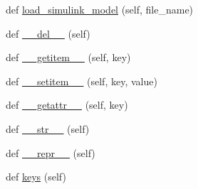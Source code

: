 \begin{DoxyCompactItemize}
\item 
def \hyperlink{classsylva_1_1misc_1_1exec_1_1_s_y_l_v_a_a9b8d4f144cb6e5feedd40761fdc3394f}{load\+\_\+simulink\+\_\+model} (self, file\+\_\+name)
\item 
def \hyperlink{classsylva_1_1misc_1_1exec_1_1_s_y_l_v_a_af65fde8b73d4a20bb2fba9d6d31d5e51}{\+\_\+\+\_\+del\+\_\+\+\_\+} (self)
\item 
def \hyperlink{classsylva_1_1misc_1_1exec_1_1_dict_object_ab360685e86a5d323b99adcde29546ebb}{\+\_\+\+\_\+getitem\+\_\+\+\_\+} (self, key)
\item 
def \hyperlink{classsylva_1_1misc_1_1exec_1_1_dict_object_a219a0c8ab7c1f0a05a76c5c79f86fe59}{\+\_\+\+\_\+setitem\+\_\+\+\_\+} (self, key, value)
\item 
def \hyperlink{classsylva_1_1misc_1_1exec_1_1_dict_object_a194306589e55ae82911d017462eb5f8e}{\+\_\+\+\_\+getattr\+\_\+\+\_\+} (self, key)
\item 
def \hyperlink{classsylva_1_1misc_1_1exec_1_1_dict_object_a7c974971714369cdba35b66479addd71}{\+\_\+\+\_\+str\+\_\+\+\_\+} (self)
\item 
def \hyperlink{classsylva_1_1misc_1_1exec_1_1_dict_object_a50fd48db155e090c3fb26a50e2999a95}{\+\_\+\+\_\+repr\+\_\+\+\_\+} (self)
\item 
def \hyperlink{classsylva_1_1misc_1_1exec_1_1_dict_object_a8a81846b980700e7552d76f4fa1eff1e}{keys} (self)
\end{DoxyCompactItemize}
